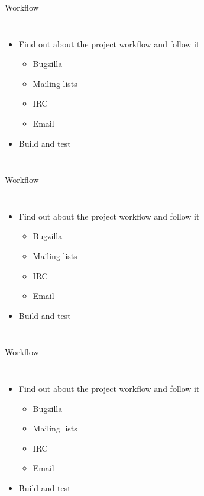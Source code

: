 \documentclass{beamer}
\begin{document}
\begin{frame}{Workflow}
  \begin{columns}
    \begin{itemize}
    \item
      Find out about the project workflow and follow it
      \begin{itemize}
      \item
        Bugzilla
      \item
        \alert{Mailing lists}
      \item
        IRC
      \item
        Email
      \end{itemize}
    \item
      Build and test
    \end{itemize}
  \end{columns}
\end{frame}

\begin{frame}{Workflow}
  \begin{columns}
    \begin{itemize}
    \item
      Find out about the project workflow and follow it
      \begin{itemize}
      \item
        Bugzilla
      \item
        Mailing lists
      \item
        \alert{IRC}
      \item
        Email
      \end{itemize}
    \item
      Build and test
    \end{itemize}
  \end{columns}
\end{frame}

\begin{frame}{Workflow}
  \begin{columns}
    \begin{itemize}
    \item
      Find out about the project workflow and follow it
      \begin{itemize}
      \item
        Bugzilla
      \item
        Mailing lists
      \item
        IRC
      \item
        \alert{Email}
      \end{itemize}
    \item
      Build and test
    \end{itemize}
  \end{columns}
\end{frame}
\end{document}
